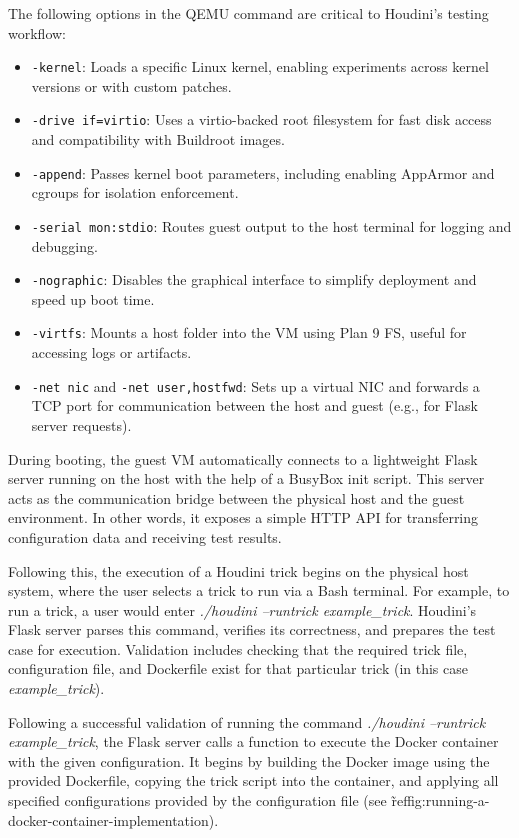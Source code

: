 \documentclass[12pt]{report}
\begin{document}
\begin{doublespace}
The following options in the QEMU command are critical to Houdini's testing workflow:

\begin{itemize}
\item \texttt{-kernel}: Loads a specific Linux kernel, enabling experiments across kernel versions or with custom patches.
\item \texttt{-drive if=virtio}: Uses a virtio-backed root filesystem for fast disk access and compatibility with Buildroot images.
\item \texttt{-append}: Passes kernel boot parameters, including enabling AppArmor and cgroups for isolation enforcement.
\item \texttt{-serial mon:stdio}: Routes guest output to the host terminal for logging and debugging.
\item \texttt{-nographic}: Disables the graphical interface to simplify deployment and speed up boot time.
\item \texttt{-virtfs}: Mounts a host folder into the VM using Plan 9 FS, useful for accessing logs or artifacts.
\item \texttt{-net nic} and \texttt{-net user,hostfwd}: Sets up a virtual NIC and forwards a TCP port for communication between the host and guest (e.g., for Flask server requests).
\end{itemize}

During booting, the guest VM automatically connects to a lightweight Flask server running on the host with the help of a BusyBox init script. This server acts as the communication bridge between the physical host and the guest environment. In other words, it exposes a simple HTTP API for transferring configuration data and receiving test results.

Following this, the execution of a Houdini trick begins on the physical host system, where the user selects a trick to run via a Bash terminal. For example, to run a trick, a user would enter \textit{./houdini --runtrick example\_trick}. Houdini's Flask server parses this command, verifies its correctness, and prepares the test case for execution. Validation includes checking that the required trick file, configuration file, and Dockerfile exist for that particular trick (in this case \textit{example\_trick}).

Following a successful validation of running the command \textit{./houdini --runtrick example\_trick}, the Flask server calls a function to execute the Docker container with the given configuration. It begins by building the Docker image using the provided Dockerfile, copying the trick script into the container, and applying all specified configurations provided by the configuration file (see \~ref{fig:running-a-docker-container-implementation}).


\end{doublespace}
\end{document}
